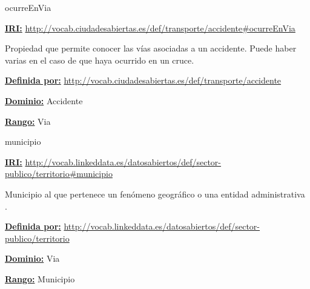 \begin{mybox}{ocurreEnVia}
\begin{flushleft}
\underline{\textbf{IRI:}}
\url{http://vocab.ciudadesabiertas.es/def/transporte/accidente#ocurreEnVia}
\newline

Propiedad que permite conocer las vías asociadas a un accidente. Puede haber varias en el caso de que haya ocurrido en un cruce.

\underline{\textbf{Definida por:}}\newline
\url{http://vocab.ciudadesabiertas.es/def/transporte/accidente}
\newline

\underline{\textbf{Dominio:}} Accidente
\newline

\underline{\textbf{Rango:}} Via
\newline

\end{flushleft}
\end{mybox}





\begin{mybox}{municipio}
\begin{flushleft}
\underline{\textbf{IRI:}}
\url{http://vocab.linkeddata.es/datosabiertos/def/sector-publico/territorio#municipio}
\newline

Municipio al que pertenece un fenómeno geográfico o una entidad administrativa  \cite{datoabiertos_municipio}.
\newline

\underline{\textbf{Definida por:}}\newline
\url{http://vocab.linkeddata.es/datosabiertos/def/sector-publico/territorio}
\newline

\underline{\textbf{Dominio:}}		Via
\newline

\underline{\textbf{Rango:}}		Municipio

\end{flushleft}
\end{mybox}




